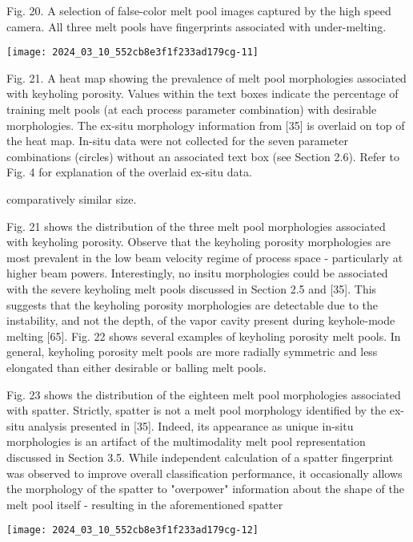 \documentclass[10pt]{article}
\begin{document}
Fig. 20. A selection of false-color melt pool images captured by the high speed camera. All three melt pools have fingerprints associated with under-melting.

\begin{center}
\texttt{[image: 2024\_03\_10\_552cb8e3f1f233ad179cg-11]}
\end{center}

Fig. 21. A heat map showing the prevalence of melt pool morphologies associated with keyholing porosity. Values within the text boxes indicate the percentage of training melt pools (at each process parameter combination) with desirable morphologies. The ex-situ morphology information from [35] is overlaid on top of the heat map. In-situ data were not collected for the seven parameter combinations (circles) without an associated text box (see Section 2.6). Refer to Fig. 4 for explanation of the overlaid ex-situ data.

comparatively similar size.

Fig. 21 shows the distribution of the three melt pool morphologies associated with keyholing porosity. Observe that the keyholing porosity morphologies are most prevalent in the low beam velocity regime of process space - particularly at higher beam powers. Interestingly, no insitu morphologies could be associated with the severe keyholing melt pools discussed in Section 2.5 and [35]. This suggests that the keyholing porosity morphologies are detectable due to the instability, and not the depth, of the vapor cavity present during keyhole-mode melting [65]. Fig. 22 shows several examples of keyholing porosity melt pools. In general, keyholing porosity melt pools are more radially symmetric and less elongated than either desirable or balling melt pools.

Fig. 23 shows the distribution of the eighteen melt pool morphologies associated with spatter. Strictly, spatter is not a melt pool morphology identified by the ex-situ analysis presented in [35]. Indeed, its appearance as unique in-situ morphologies is an artifact of the multimodality melt pool representation discussed in Section 3.5. While independent calculation of a spatter fingerprint was observed to improve overall classification performance, it occasionally allows the morphology of the spatter to "overpower" information about the shape of the melt pool itself - resulting in the aforementioned spatter

\begin{center}
\texttt{[image: 2024\_03\_10\_552cb8e3f1f233ad179cg-12]}
\end{center}
\end{document}
